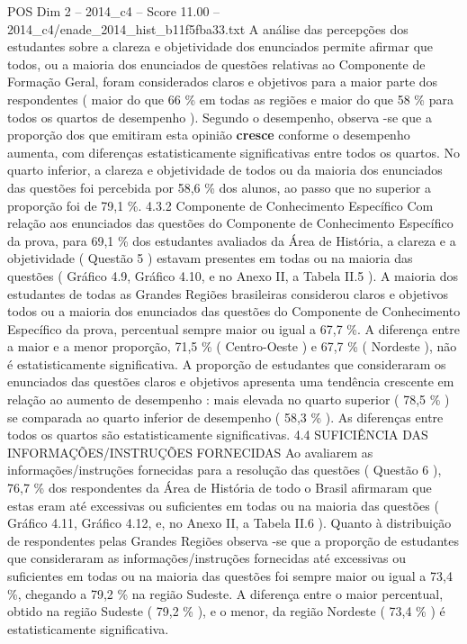 \begin{textsample}{POS Dim 2 – 2014\_c4 – Score 11.00 – 2014\_c4/enade\_2014\_hist\_b11f5fba33.txt}
A análise das percepções dos estudantes sobre a clareza e objetividade dos enunciados permite afirmar que todos, ou a maioria dos enunciados de questões relativas ao Componente de Formação Geral, foram considerados claros e objetivos para a maior parte dos respondentes ( maior do que 66 \% em todas as regiões e maior do que 58 \% para todos os quartos de desempenho ).
Segundo o desempenho, observa -se que a proporção dos que emitiram esta opinião \textbf{cresce} conforme o desempenho aumenta, com diferenças estatisticamente significativas entre todos os quartos.
No quarto inferior, a clareza e objetividade de todos ou da maioria dos enunciados das questões foi percebida por 58,6 \% dos alunos, ao passo que no superior a proporção foi de 79,1 \%. 4.3.2 Componente de Conhecimento Específico Com relação aos enunciados das questões do Componente de Conhecimento Específico da prova, para 69,1 \% dos estudantes avaliados da Área de História, a clareza e a objetividade ( Questão 5 ) estavam presentes em todas ou na maioria das questões ( Gráfico 4.9, Gráfico 4.10, e no Anexo II, a Tabela II.5 ).
A maioria dos estudantes de todas as Grandes Regiões brasileiras considerou claros e objetivos todos ou a maioria dos enunciados das questões do Componente de Conhecimento Específico da prova, percentual sempre maior ou igual a 67,7 \%.
A diferença entre a maior e a menor proporção, 71,5 \% ( Centro-Oeste ) e 67,7 \% ( Nordeste ), não é estatisticamente significativa.
A proporção de estudantes que consideraram os enunciados das questões claros e objetivos apresenta uma tendência crescente em relação ao aumento de desempenho : mais elevada no quarto superior ( 78,5 \% ) se comparada ao quarto inferior de desempenho ( 58,3 \% ).
As diferenças entre todos os quartos são estatisticamente significativas. 4.4 SUFICIÊNCIA DAS INFORMAÇÕES/INSTRUÇÕES FORNECIDAS Ao avaliarem as informações/instruções fornecidas para a resolução das questões ( Questão 6 ), 76,7 \% dos respondentes da Área de História de todo o Brasil afirmaram que estas eram até excessivas ou suficientes em todas ou na maioria das questões ( Gráfico 4.11, Gráfico 4.12, e, no Anexo II, a Tabela II.6 ).
Quanto à distribuição de respondentes pelas Grandes Regiões observa -se que a proporção de estudantes que consideraram as informações/instruções fornecidas até excessivas ou suficientes em todas ou na maioria das questões foi sempre maior ou igual a 73,4 \%, chegando a 79,2 \% na região Sudeste.
A diferença entre o maior percentual, obtido na região Sudeste ( 79,2 \% ), e o menor, da região Nordeste ( 73,4 \% ) é estatisticamente significativa.

\end{textsample}
